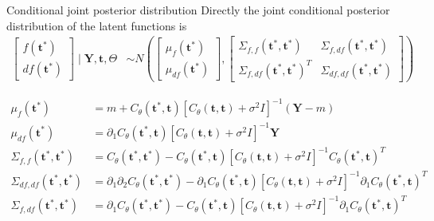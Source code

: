 \documentclass[ignorenonframetext,xcolor=pdflatex,table,dvipsnames,serif]{beamer}
\begin{document}
\begin{frame}{Conditional joint posterior distribution}
Directly the joint conditional posterior distribution of the latent functions is
\begin{align*}
\begin{bmatrix}f(\mathbf{t}^\ast)\\ df(\mathbf{t}^\ast) \end{bmatrix} \mid \mathbf{Y}, \mathbf{t}, \Theta &\sim
N\left(\begin{bmatrix}\mu_f(\mathbf{t}^\ast)\\ \mu_{df}(\mathbf{t}^\ast)\end{bmatrix}, \begin{bmatrix}\Sigma_{f,f}(\mathbf{t}^\ast, \mathbf{t}^\ast) & \Sigma_{f,df}(\mathbf{t}^\ast, \mathbf{t}^\ast)\\ \Sigma_{f,df}(\mathbf{t}^\ast, \mathbf{t}^\ast)^T & \Sigma_{df,df}(\mathbf{t}^\ast, \mathbf{t}^\ast)\end{bmatrix}\right)
\end{align*}

{\footnotesize
\begin{align*}
  \mu_f(\mathbf{t}^\ast) &= m + C_\theta(\mathbf{t}^\ast, \mathbf{t})\left[C_\theta(\mathbf{t}, \mathbf{t}) + \sigma^2 I\right]^{-1}\left(\mathbf{Y} - m\right)\nonumber\\
  \mu_{df}(\mathbf{t}^\ast) &= \partial_1 C_\theta(\mathbf{t}^\ast, \mathbf{t})\left[C_\theta(\mathbf{t}, \mathbf{t}) + \sigma^2 I\right]^{-1}\mathbf{Y}\nonumber\\
  \Sigma_{f,f}(\mathbf{t}^\ast, \mathbf{t}^\ast) &= C_\theta(\mathbf{t}^\ast, \mathbf{t}^\ast) - C_\theta(\mathbf{t}^\ast, \mathbf{t})\left[C_\theta(\mathbf{t}, \mathbf{t}) + \sigma^2 I\right]^{-1} C_\theta(\mathbf{t}^\ast, \mathbf{t})^T\nonumber\\
  \Sigma_{df,df}(\mathbf{t}^\ast, \mathbf{t}^\ast) &= \partial_1 \partial_2 C_\theta(\mathbf{t}^\ast, \mathbf{t}^\ast) - \partial_1 C_\theta(\mathbf{t}^\ast, \mathbf{t})\left[C_\theta(\mathbf{t}, \mathbf{t}) + \sigma^2 I\right]^{-1} \partial_1 C_\theta(\mathbf{t}^\ast, \mathbf{t})^T\nonumber\\
  \Sigma_{f,df}(\mathbf{t}^\ast, \mathbf{t}^\ast) &= \partial_1 C_\theta(\mathbf{t}^\ast, \mathbf{t}^\ast) - C_\theta(\mathbf{t}^\ast, \mathbf{t})\left[C_\theta(\mathbf{t}, \mathbf{t}) + \sigma^2 I\right]^{-1}\partial_1 C_\theta(\mathbf{t}^\ast, \mathbf{t})^T\nonumber
\end{align*}
}%
\end{frame}
\end{document}
